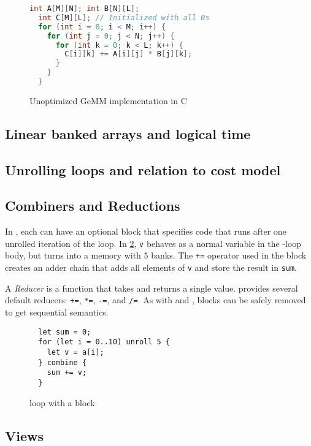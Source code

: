 \documentclass[acmsmall,review,anonymous]{acmart}\settopmatter{printfolios=true,printccs=false,printacmref=false}
\begin{document}
\begin{figure}[t]
\begin{lstlisting}[language=C++]
  int A[M][N]; int B[N][L];
  int C[M][L]; // Initialized with all 0s
  for (int i = 0; i < M; i++) {
    for (int j = 0; j < N; j++) {
      for (int k = 0; k < L; k++) {
        C[i][k] += A[i][j] * B[j][k];
      }
    }
  }
\end{lstlisting}
\caption{Unoptimized GeMM implementation in C}\label{lst:combine}
\end{figure}

\subsection{Linear banked arrays and logical time}
\subsection{Unrolling loops and relation to cost model}
\subsection{Combiners and Reductions}
In \sys{}, each \sysfor{} can have an optional \syscombine{} block that specifies
code that runs after one unrolled iteration of the loop. In \cref{lst:combine},
\lstinline|v| behaves as a normal variable in the \sysfor{}-loop body, but
turns into a memory with $5$ banks. The \lstinline|+=| operator used in the
\syscombine{} block creates an adder chain that adds all elements of \lstinline|v|
and store the result in \lstinline|sum|.

A \textit{Reducer} is a function that takes  and returns a single
value. \sys{} provides several default reducers: \lstinline|+=|, \lstinline|*=|,
\lstinline|-=|, and \lstinline|/=|. As with \sysunroll{} and \sysbank{},
\syscombine{} blocks can be safely removed to get sequential semantics.

\begin{figure}[t]
\begin{lstlisting}
  let sum = 0;
  for (let i = 0..10) unroll 5 {
    let v = a[i];
  } combine {
    sum += v;
  }
\end{lstlisting}
\caption{\sysfor{} loop with a \syscombine{} block}\label{lst:combine}
\end{figure}

\subsection{Views}
\end{document}

